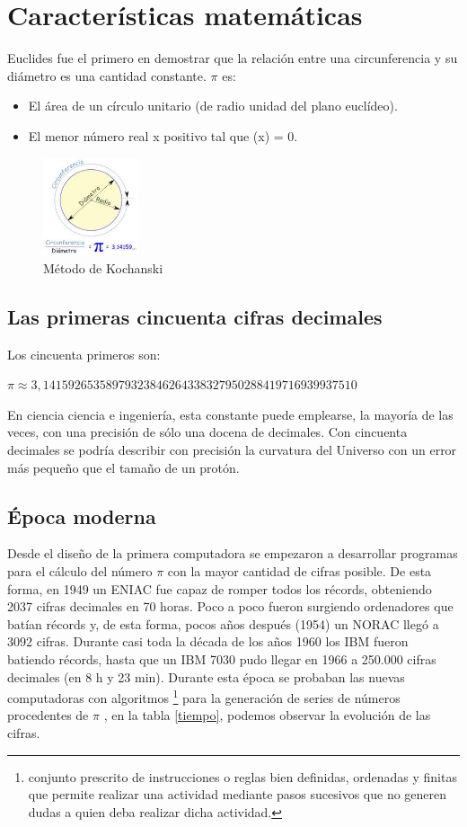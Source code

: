 \documentclass[spanish,a4paper,11pt]{article}
\newcommand{\PI}{{$\pi$ }}
\begin{document}
\section{Características matemáticas}
Euclides fue el primero en demostrar que la relación entre una circunferencia y su diámetro es una cantidad constante. \PI es:
\begin{itemize}
\item El área de un círculo unitario (de radio unidad del plano euclídeo).
\item El menor número real x positivo tal que \sin(x) = 0.
\end{itemize}
\begin{figure}[!th]
\begin{center}
\includegraphics[width=0.25\textwidth]{images/diametro.jpeg}
\caption{Método de Kochanski}
\label{Kochanski}
\end{center}
\end{figure}

\subsection{Las primeras cincuenta cifras decimales}
Los cincuenta primeros son:
\centerline{$\pi \approx 3,14159265358979323846264338327950288419716939937510 $}
En ciencia ciencia e ingeniería, esta constante puede emplearse, la mayoría de las veces, 
con una precisión de sólo una docena de decimales. Con cincuenta decimales se podría describir con precisión la curvatura del Universo con un error más pequeño 
que el tamaño de un protón.

\subsection{Época moderna}
Desde el diseño de la primera computadora se empezaron a desarrollar programas para el cálculo del número \PI con la mayor cantidad de cifras
posible. De esta forma, en 1949 un ENIAC fue capaz de romper todos los récords, obteniendo 2037 cifras decimales en 70 horas. Poco a poco fueron
surgiendo ordenadores que batían récords y, de esta forma, pocos años después (1954) un NORAC llegó a 3092 cifras. Durante casi toda la década
de los años 1960 los IBM fueron batiendo récords, hasta que un IBM 7030 pudo llegar en 1966 a 250.000 cifras decimales (en 8 h y 23 min).
Durante esta época se probaban las nuevas computadoras con algoritmos \footnote{conjunto prescrito de instrucciones o reglas bien definidas, ordenadas 
y finitas que permite realizar una actividad mediante pasos sucesivos que no generen dudas a quien deba realizar dicha actividad.} para la generación de series 
de números procedentes de \PI, en la tabla \ref{tiempo},
podemos observar la evolución de las cifras.
\end{document}
